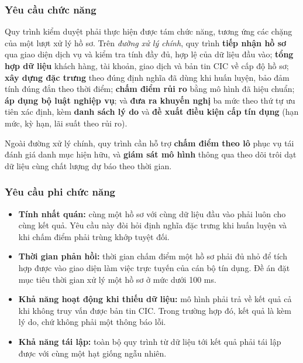 \subsubsection{Yêu cầu chức năng}

Quy trình kiểm duyệt phải thực hiện được tám chức năng, tương ứng các chặng của
một lượt xử lý hồ sơ. Trên \textit{đường xử lý chính}, quy trình
\textbf{tiếp nhận hồ sơ} qua
giao diện dịch vụ và kiểm tra tính đầy đủ, hợp lệ của dữ liệu đầu vào;
\textbf{tổng hợp dữ liệu} khách hàng, tài khoản, giao dịch và bản tin CIC về cấp
độ hồ sơ; \textbf{xây dựng đặc trưng} theo đúng định nghĩa đã dùng khi huấn
luyện, bảo đảm tính đúng đắn theo thời điểm; \textbf{chấm điểm rủi ro} bằng mô
hình đã hiệu chuẩn; \textbf{áp dụng bộ luật nghiệp vụ}; và \textbf{đưa ra khuyến
nghị} ba mức theo thứ tự ưu tiên xác định, kèm \textbf{danh sách lý do} và
\textbf{đề xuất điều kiện cấp tín dụng} (hạn mức, kỳ hạn, lãi suất theo rủi ro).

Ngoài đường xử lý chính, quy trình cần hỗ trợ \textbf{chấm điểm theo lô} phục vụ
tái đánh giá danh mục hiện hữu, và \textbf{giám sát mô hình} thông qua theo dõi
trôi dạt dữ liệu cùng chất lượng dự báo theo thời gian.

\subsubsection{Yêu cầu phi chức năng}

\begin{itemize}
  \item \textbf{Tính nhất quán:} cùng một hồ sơ với cùng dữ liệu đầu vào phải
  luôn cho cùng kết quả. Yêu cầu này đòi hỏi định nghĩa đặc trưng khi huấn luyện
  và khi chấm điểm phải trùng khớp tuyệt đối.

  \item \textbf{Thời gian phản hồi:} thời gian chấm điểm một hồ sơ phải đủ nhỏ để
  tích hợp được vào giao diện làm việc trực tuyến của cán bộ tín dụng. Đề án đặt
  mục tiêu thời gian xử lý một hồ sơ ở mức dưới 100 ms.

  \item \textbf{Khả năng hoạt động khi thiếu dữ liệu:} mô hình phải trả về kết
  quả cả khi không truy vấn được bản tin CIC. Trong trường hợp đó, kết quả là
   kèm lý do, chứ không phải một thông báo lỗi.

  \item \textbf{Khả năng tái lập:} toàn bộ quy trình từ dữ liệu tới kết quả phải
  tái lập được với cùng một hạt giống ngẫu nhiên.
\end{itemize}

